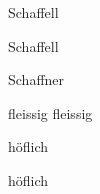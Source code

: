 \documentclass{article}
\begin{document}
Schaffell

Schaf\/fell


Schaffner

fleissig
f\/leissig

höflich

höf\/lich
\end{document}
